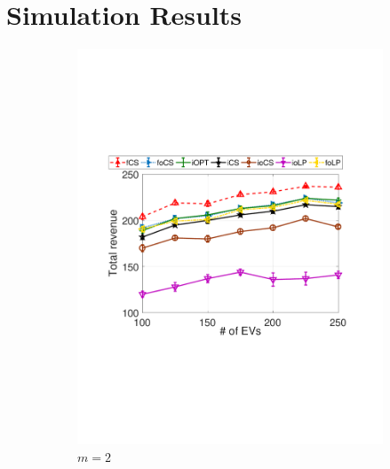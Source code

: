 \documentclass[journal]{IEEEtran}
\newcommand{\revv}[1]{{\color{black}#1}}%
\begin{document}
		
\section{Simulation Results}
			\label{sec:simul}
			
			
						\begin{figure}[t]	
				\centering
				\begin{subfigure}[b]{0.25\textwidth}
					\begin{center}
						\includegraphics[width=\textwidth]{V-N-M2.pdf}
						\caption{\revv{$m=2$}}
						\label{fig:V-N-M2}
					\end{center}
				\end{subfigure}
				\begin{subfigure}[b]{0.25\textwidth}
					\begin{center}

\end{center}
\end{subfigure}
\end{figure}
\end{document}
